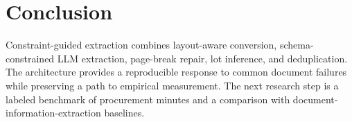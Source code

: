 \documentclass[conference]{IEEEtran}
\begin{document}
\section{Conclusion}
Constraint-guided extraction combines layout-aware conversion, schema-constrained LLM extraction, page-break repair, lot inference, and deduplication. The architecture provides a reproducible response to common document failures while preserving a path to empirical measurement. The next research step is a labeled benchmark of procurement minutes and a comparison with document-information-extraction baselines.



\end{document}
